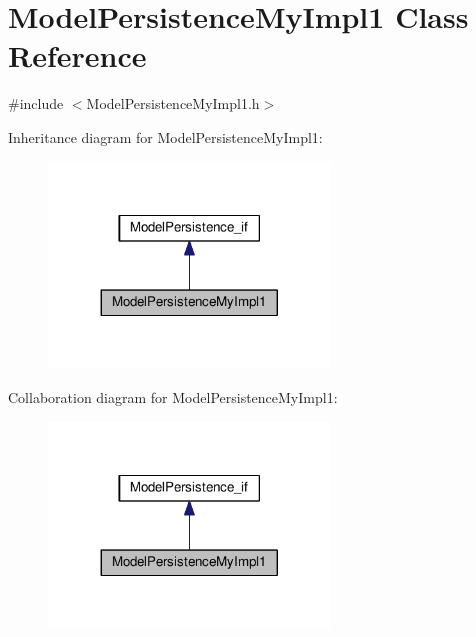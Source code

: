 \hypertarget{class_model_persistence_my_impl1}{\section{Model\-Persistence\-My\-Impl1 Class Reference}
\label{class_model_persistence_my_impl1}
}


{\ttfamily \#include $<$Model\-Persistence\-My\-Impl1.\-h$>$}



Inheritance diagram for Model\-Persistence\-My\-Impl1\-:\nopagebreak
\begin{figure}[H]
\begin{center}
\leavevmode
\includegraphics[width=212pt]{class_model_persistence_my_impl1__inherit__graph}
\end{center}
\end{figure}


Collaboration diagram for Model\-Persistence\-My\-Impl1\-:\nopagebreak
\begin{figure}[H]
\begin{center}
\leavevmode
\includegraphics[width=212pt]{class_model_persistence_my_impl1__coll__graph}
\end{center}
\end{figure}
